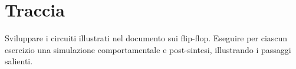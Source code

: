 %

\section{Traccia}

Sviluppare i circuiti illustrati nel documento sui flip-flop. Eseguire
per ciascun esercizio una simulazione comportamentale e post-sintesi,
illustrando i passaggi salienti.%

